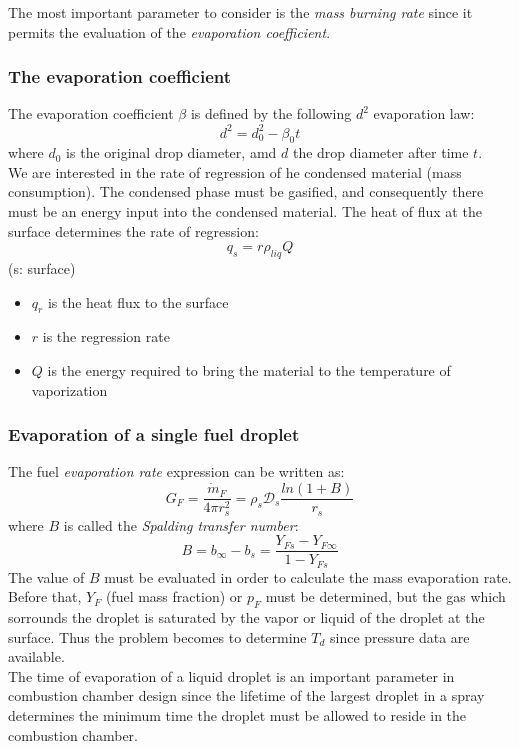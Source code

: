 \documentclass[12pt]{article}
\begin{document}
The most important parameter to consider is the \textit{mass burning rate} since it permits the evaluation of the \textit{evaporation coefficient}.

\subsubsection{The evaporation coefficient}

The evaporation coefficient $\beta$ is defined by the following $d^{2}$ evaporation law:
\begin{equation}
    d^{2}=d_{0}^{2}-\beta_{0}t
\end{equation}
where $d_{0}$ is the original drop diameter, amd $d$ the drop diameter after time $t$.\\
We are interested in the rate of regression of he condensed material (mass consumption). The condensed phase must be gasified, and consequently there must be an energy input into the condensed material. The heat of flux at the surface determines the rate of regression:
\begin{equation}
    q_{s}=r\rho_{liq}Q
\end{equation}
(s: surface)
\begin{itemize}
    \item $q_{r}$ is the heat flux to the surface
    \item $r$ is the regression rate
    \item $Q$ is the energy required to bring the material to the temperature of vaporization
\end{itemize}

\subsubsection{Evaporation of a single fuel droplet}

The fuel \textit{evaporation rate} expression can be written as:
\begin{equation}
    G_{F}=\frac{\dot{m}_{F}}{4\pi r_{s}^{2}}=\rho_{s}\mathcal{D}_{s}\frac{ln(1+B)}{r_{s}}
\end{equation}
 where $B$ is called the \textit{Spalding transfer number}:
 \begin{equation}
     B=b_{\infty}-b_{s}=\frac{Y_{Fs}-Y_{F\infty}}{1-Y_{Fs}}
 \end{equation}
 The value of $B$ must be evaluated in order to calculate the mass evaporation rate. Before that, $Y_{F}$ (fuel mass fraction) or $p_{F}$ must be determined, but the gas which sorrounds the droplet is saturated by the vapor or liquid of the droplet at the surface. Thus the problem becomes to determine $T_{d}$ since pressure data are available.\\
 The time of evaporation of a liquid droplet is an important parameter in combustion chamber design since the lifetime of the largest droplet in a spray determines the minimum time the droplet must be allowed to reside in the combustion chamber.
 
\end{document}
